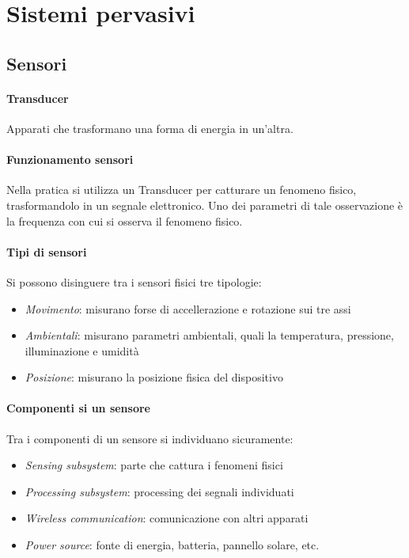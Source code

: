 \section{Sistemi pervasivi}

\subsection{Sensori}

\paragraph{Transducer}
Apparati che trasformano una forma di energia in un'altra.

\paragraph{Funzionamento sensori}
Nella pratica si utilizza un Transducer per catturare
un fenomeno fisico, trasformandolo in un segnale elettronico.
Uno dei parametri di tale osservazione è la frequenza con 
cui si osserva il fenomeno fisico.

\paragraph{Tipi di sensori}
Si possono disinguere tra i sensori fisici tre tipologie:
\begin{itemize}
    \item \emph{Movimento}: misurano forse di accellerazione 
    e rotazione sui tre assi
    \item \emph{Ambientali}: misurano parametri ambientali, 
    quali la temperatura, pressione, illuminazione e umidità
    \item \emph{Posizione}: misurano la posizione fisica del 
    dispositivo
\end{itemize}

\paragraph{Componenti si un sensore}
Tra i componenti di un sensore si individuano sicuramente:
\begin{itemize}
    \item \emph{Sensing subsystem}: parte che cattura i fenomeni
    fisici
    \item \emph{Processing subsystem}: processing dei segnali individuati
    \item \emph{Wireless communication}: comunicazione con altri apparati
    \item \emph{Power source}: fonte di energia, batteria, pannello solare, etc.
\end{itemize}

